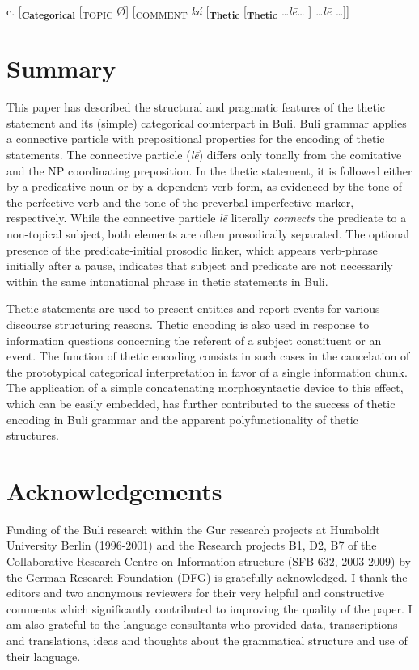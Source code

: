 \documentclass[output=paper]{langsci/langscibook}
\begin{document}
    c.   [\textbf{\textsubscript{Categorical}}\textsubscript{} [\textsubscript{TOPIC} Ø]\textsubscript{} [\textsubscript{COMMENT}\textit{ ká} [\textbf{\textsubscript{Thetic}} [\textbf{\textsubscript{Thetic}} \textit{…l\={e}…} ] \textit{…l\={e} …}]]
\z

\section{Summary}\label{sec:schwarz:4}

This paper has described the structural and pragmatic features of the thetic statement and its (simple) categorical counterpart in Buli. Buli grammar applies a connective particle with prepositional properties for the encoding of thetic statements. The connective particle (\textit{l\={e}}) differs only tonally from the comitative and the NP coordinating preposition. In the thetic statement, it is followed either by a predicative noun or by a dependent verb form, as evidenced by the tone of the perfective verb and the tone of the preverbal imperfective marker, respectively. While the connective particle\textit{ l\={e}} literally \textit{connects} the predicate to a non-topical subject, both elements are often prosodically separated. The optional presence of the predicate-initial prosodic linker, which appears verb-phrase initially after a pause, indicates that subject and predicate are not necessarily within the same intonational phrase in thetic statements in Buli. 

Thetic statements are used to present entities and report events for various discourse structuring reasons. Thetic encoding is also used in response to information questions concerning the referent of a subject constituent or an event. The function of thetic encoding consists in such cases in the cancelation of the prototypical categorical interpretation in favor of a single information chunk. The application of a simple concatenating morphosyntactic device to this effect, which can be easily embedded, has further contributed to the success of thetic encoding in Buli grammar and the apparent polyfunctionality of thetic structures. 

\section*{ Acknowledgements} 

Funding of the Buli research within the Gur research projects at Humboldt University Berlin (1996-2001) and the Research projects B1, D2, B7 of the Collaborative Research Centre on Information structure (SFB 632, 2003-2009) by the German Research Foundation (DFG) is gratefully acknowledged. I thank the editors and two anonymous reviewers for their very helpful and constructive comments which significantly contributed to improving the quality of the paper. I am also grateful to the language consultants who provided data, transcriptions and translations, ideas and thoughts about the grammatical structure and use of their language.
\end{document}
